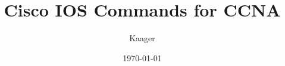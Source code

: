




\title{Cisco IOS Commands for CCNA}
\date{\today}
\author{Kaager\\
\href{https://github.com/Kaager/cisci}{\faGithub}}

\maketitle

\tableofcontents
\pagebreak

















